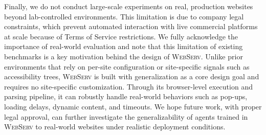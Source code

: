 \documentclass{article}
\DeclareRobustCommand{\projectname}{\textsc{WebServ}\xspace}
\begin{document}
Finally, we do not conduct large-scale experiments on real, production websites beyond lab-controlled environments.
This limitation is due to company legal constraints, which prevent automated interaction with live commercial platforms at scale because of Terms of Service restrictions.
We fully acknowledge the importance of real-world evaluation and note that this limitation of existing benchmarks is a key motivation behind the design of \projectname.
Unlike prior environments that rely on per-site configuration or site-specific signals such as accessibility trees, \projectname is built with generalization as a core design goal and requires no site-specific customization.
Through its browser-level execution and parsing pipeline, it can robustly handle real-world behaviors such as pop-ups, loading delays, dynamic content, and timeouts.
We hope future work, with proper legal approval, can further investigate the generalizability of agents trained in \projectname to real-world websites under realistic deployment conditions.





\appendix
\end{document}
